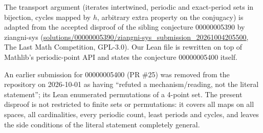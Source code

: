 \documentclass[11pt]{article}
\theoremstyle{definition}
\theoremstyle{remark}
\renewcommand{\_}{\oldus\allowbreak}
\begin{document}
The transport argument (iterates intertwined, periodic and exact-period sets in bijection, cycles
mapped by $h$, arbitrary extra property on the conjugacy) is adapted from the accepted disproof of
the sibling conjecture 00000005390 by ziangni-sys
(\url{solutions/00000005390/ziangni-sys_submission_20261004205500}, The Last Math Competition,
GPL-3.0). Our Lean file is rewritten on top of Mathlib's periodic-point API and states the conjecture
00000005400 itself.

An earlier submission for 00000005400 (PR \#25) was removed from the repository on 2026-10-01 as having
``refuted a mechanism/reading, not the literal statement''; its Lean enumerated permutations of a
4-point set. The present disproof is not restricted to finite sets or permutations: it covers
all maps on all spaces, all cardinalities, every periodic count, least periods and cycles, and leaves
the side conditions of the literal statement completely general.
\end{document}
